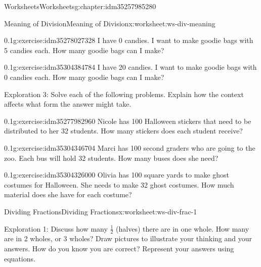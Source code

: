 \documentclass[twoside,11pt,]{book}
\begin{document}
\begin{chapterptx}{Worksheets}{}{Worksheets}{}{}{g:chapter:idm35257985280}
\begin{worksheet-section-numberless}{Meaning of Division}{}{Meaning of Division}{}{}{x:worksheet:ws-div-meaning}
\begin{introduction}{}
\end{introduction}%
\begin{divisionexercise}{5}{}{0.1}{g:exercise:idm35278027328}%
I have 0 candies.  I want to make goodie bags with 5 candies each.  How many goodie bags can I make?%
\end{divisionexercise}%
\begin{divisionexercise}{6}{}{0.1}{g:exercise:idm35304384784}%
I have 20 candies.  I want to make goodie bags with 0 candies each.  How many goodie bags can I make?%
\end{divisionexercise}%
\begin{introduction}{}%
Exploration 3: Solve each of the following problems. Explain how the context affects what form the answer might take.%
\end{introduction}%
\begin{divisionexercise}{7}{}{0.1}{g:exercise:idm35277982960}%
Nicole has 100 Halloween stickers that need to be distributed to her 32 students. How many stickers does each student receive?%
\end{divisionexercise}%
\begin{divisionexercise}{8}{}{0.1}{g:exercise:idm35304346704}%
Marci has 100 second graders who are going to the zoo. Each bus will hold 32 students. How many buses does she need?%
\end{divisionexercise}%
\begin{divisionexercise}{9}{}{0.1}{g:exercise:idm35304326000}%
Olivia has 100 square yards to make ghost costumes for Halloween. She needs to make 32 ghost costumes. How much material does she have for each costume?%
\end{divisionexercise}%
\end{worksheet-section-numberless}
\restoregeometry
%
%
\typeout{************************************************}
\typeout{************************************************}
%
\begin{worksheet-section-numberless}{Dividing Fractions}{}{Dividing Fractions}{}{}{x:worksheet:ws-div-frac-1}
\begin{introduction}{}%
Exploration 1: Discuss how many \(\frac{1}{2} \) (halves) there are in one whole. How many are in 2 wholes, or 3 wholes? Draw pictures to illustrate your thinking and your answers. How do you know you are correct? Represent your answers using equations.%
\end{introduction}%
\end{worksheet-section-numberless}

\end{chapterptx}
\end{document}
